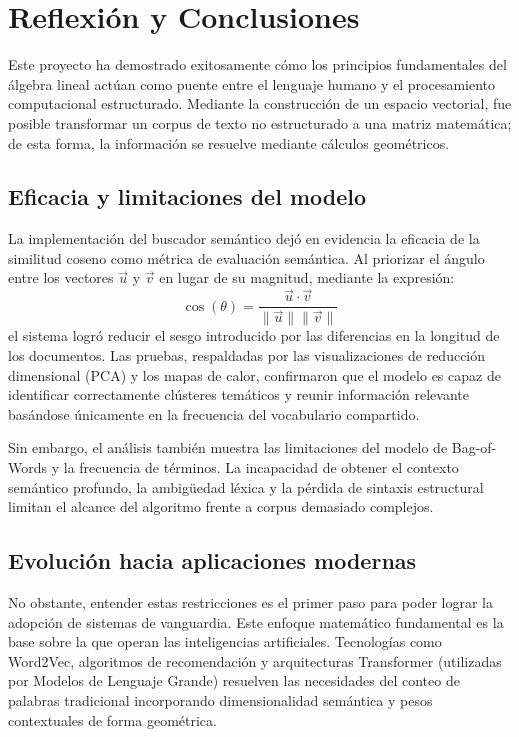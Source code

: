\documentclass[12pt, a4paper]{article}
\begin{document}
\section{Reflexión y Conclusiones}

Este proyecto ha demostrado exitosamente cómo los principios fundamentales del álgebra lineal actúan como puente entre el lenguaje humano y el procesamiento computacional estructurado. Mediante la construcción de un espacio vectorial, fue posible transformar un corpus de texto no estructurado a una matriz matemática; de esta forma, la información se resuelve mediante cálculos geométricos.

\subsection{Eficacia y limitaciones del modelo}

La implementación del buscador semántico dejó en evidencia la eficacia de la similitud coseno como métrica de evaluación semántica. Al priorizar el ángulo entre los vectores $\vec{u}$ y $\vec{v}$ en lugar de su magnitud, mediante la expresión:
\[
\cos(\theta) = \frac{\vec{u} \cdot \vec{v}}{\|\vec{u}\| \|\vec{v}\|}
\]
el sistema logró reducir el sesgo introducido por las diferencias en la longitud de los documentos. Las pruebas, respaldadas por las visualizaciones de reducción dimensional (PCA) y los mapas de calor, confirmaron que el modelo es capaz de identificar correctamente clústeres temáticos y reunir información relevante basándose únicamente en la frecuencia del vocabulario compartido.

Sin embargo, el análisis también muestra las limitaciones del modelo de Bag-of-Words y la frecuencia de términos. La incapacidad de obtener el contexto semántico profundo, la ambigüedad léxica y la pérdida de sintaxis estructural limitan el alcance del algoritmo frente a corpus demasiado complejos.

\subsection{Evolución hacia aplicaciones modernas}

No obstante, entender estas restricciones es el primer paso para poder lograr la adopción de sistemas de vanguardia. Este enfoque matemático fundamental es la base sobre la que operan las inteligencias artificiales. Tecnologías como Word2Vec, algoritmos de recomendación y arquitecturas Transformer (utilizadas por Modelos de Lenguaje Grande) resuelven las necesidades del conteo de palabras tradicional incorporando dimensionalidad semántica y pesos contextuales de forma geométrica. 
\end{document}

